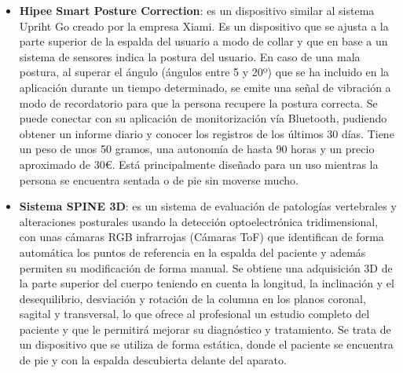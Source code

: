 \begin{itemize}
    
    
    \item \textbf{Hipee Smart Posture Correction}\cite{Hipee1,Hipee2}: es un dispositivo similar al sistema Upriht Go creado por la empresa Xiami. Es un dispositivo que se ajusta a la parte superior de la espalda del usuario a modo de collar y que en base a un sistema de sensores indica la postura del usuario. En caso de una mala postura, al superar el ángulo (ángulos entre 5 y 20º) que se ha incluido en la aplicación durante un tiempo determinado, se emite una señal de vibración a modo de recordatorio para que la persona recupere la postura correcta. Se puede conectar con su aplicación de monitorización vía Bluetooth, pudiendo obtener un informe diario y conocer los registros de los últimos 30 días. Tiene un peso de unos 50 gramos, una autonomía de hasta 90 horas y un precio aproximado de 30€. Está principalmente diseñado para un uso mientras la persona se encuentra sentada o de pie sin moverse mucho. 

    \item \textbf{Sistema SPINE 3D}\cite{SPINE3D}: es un sistema de evaluación de patologías vertebrales y alteraciones posturales usando la detección optoelectrónica tridimensional, con unas cámaras RGB infrarrojas (Cámaras ToF) que identifican de forma automática los puntos de referencia en la espalda del paciente y además permiten su modificación de forma manual. Se obtiene una adquisición 3D de la parte superior del cuerpo teniendo en cuenta la longitud, la inclinación y el desequilibrio, desviación y rotación de la columna en los planos coronal, sagital y transversal, lo que ofrece al profesional un estudio completo del paciente y que le permitirá mejorar su diagnóstico y tratamiento. Se trata de un dispositivo que se utiliza de forma estática, donde el paciente se encuentra de pie y con la espalda descubierta delante del aparato. 


\end{itemize}
